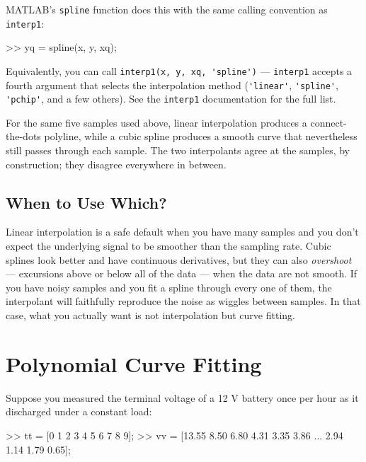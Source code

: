 \documentclass[../../book.tex]{subfiles}
\begin{document}
MATLAB's \lstinline{spline} function does this with the same calling convention as \lstinline{interp1}:

\begin{code}
>> yq = spline(x, y, xq);
\end{code}

Equivalently, you can call \lstinline{interp1(x, y, xq, 'spline')} --- \lstinline{interp1} accepts a fourth argument that selects the interpolation method (\lstinline{'linear'}, \lstinline{'spline'}, \lstinline{'pchip'}, and a few others).  See the \lstinline{interp1} documentation for the full list.

For the same five samples used above, linear interpolation produces a connect-the-dots polyline, while a cubic spline produces a smooth curve that nevertheless still passes through each sample.  The two interpolants agree at the samples, by construction; they disagree everywhere in between.

\subsection{When to Use Which?}

Linear interpolation is a safe default when you have many samples and you don't expect the underlying signal to be smoother than the sampling rate.  Cubic splines look better and have continuous derivatives, but they can also \emph{overshoot} --- excursions above or below all of the data --- when the data are not smooth.  If you have noisy samples and you fit a spline through every one of them, the interpolant will faithfully reproduce the noise as wiggles between samples.  In that case, what you actually want is not interpolation but curve fitting.

\section{Polynomial Curve Fitting}


Suppose you measured the terminal voltage of a 12 V battery once per hour as it discharged under a constant load:

\begin{code}
>> tt = [0 1 2 3 4 5 6 7 8 9];                    %
>> vv = [13.55 8.50 6.80 4.31 3.35 3.86 ...
         2.94 1.14 1.79 0.65];                    %
\end{code}
\end{document}
